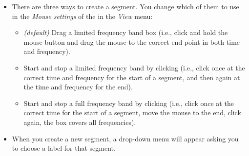 \documentclass{scrartcl}
\begin{document}
\begin{itemize}
	\item There are three ways to create a segment. You change which of them to use in the \textit{Mouse settings} of the \textit{} in the \textit{View} menu:

	\begin{itemize}
		\item \textit{(default)} Drag a limited frequency band box (i.e., click and hold the mouse button and drag the mouse to the correct end point in both time and frequency).
		\item Start and stop a limited frequency band by clicking (i.e., click once at the correct time and frequency for the start of a segment, and then again at the time and frequency for the end).
		\item Start and stop a full frequency band by clicking (i.e., click once at the correct time for the start of a segment, move the mouse to the end, click again, the box covers all frequencies).
	\end{itemize}
	
	\item When you create a new segment, a drop-down menu will appear asking you to choose a label for that segment. 


\end{itemize}
\end{document}
